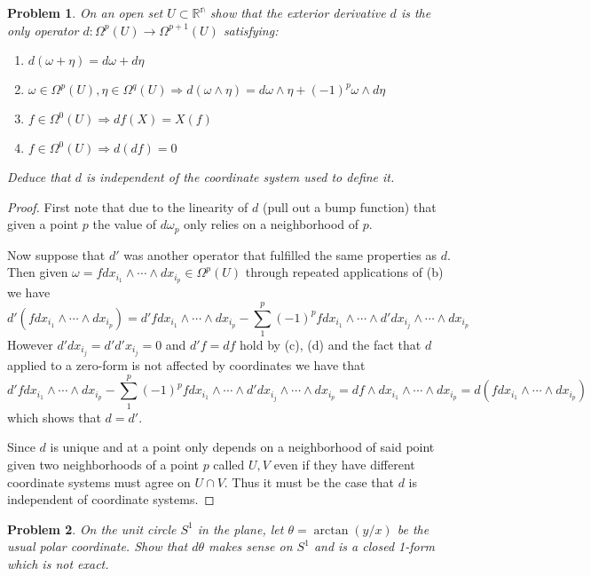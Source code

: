 \documentclass[10pt]{article}
\newcommand{\sk}{\vskip 10mm}
\newcommand{\bb}[1]{\mathbb{#1}}
\theoremstyle{plain}
\newtheorem{problem}{Problem}
\theoremstyle{remark}
\begin{document}
\begin{problem}
  On an open set $U\subset \bb{R^n}$ show that the exterior derivative $d$ is
  the only operator $d:\Omega^p(U)\rightarrow\Omega^{p+1}(U)$ satisfying:
  \begin{enumerate}
  \item[(a)] $d(\omega+\eta)=d\omega+d\eta$
  \item[(b)] $\omega\in\Omega^p(U),\eta\in\Omega^q(U)\Rightarrow
    d(\omega\wedge \eta)=d\omega\wedge\eta+(-1)^p\omega\wedge d\eta$
  \item[(c)] $f\in\Omega^0(U)\Rightarrow df(X)=X(f)$
  \item[(d)] $f\in\Omega^0(U)\Rightarrow d(df)=0$
  \end{enumerate}
  Deduce that $d$ is independent of the coordinate system used to define it.
\end{problem}

\begin{proof}
  First note that due to the linearity of $d$ (pull out a bump function)
  that given a point $p$ the value of $d\omega_p$ only relies on a
  neighborhood of $p$.

  Now suppose that $d'$ was another operator that fulfilled the same
  properties as $d$. Then given $\omega=fdx_{i_1}\wedge\cdots\wedge dx_{i_p}\in\Omega^p(U)$
  through repeated applications of (b) we have
  \[
    d'(fdx_{i_1}\wedge\cdots\wedge dx_{i_p})=d'fdx_{i_1}\wedge\cdots\wedge dx_{i_p} -\sum_1^p(-1)^pfdx_{i_1}\wedge\cdots\wedge d'dx_{i_j}\wedge\cdots\wedge dx_{i_p}
  \]
  However $d'dx_{i_j} = d'd'x_{i_j}= 0$ and $d'f=df$ hold by (c), (d) and the fact that
  $d$ applied to a zero-form is not affected by coordinates we have that
  \[
    d'fdx_{i_1}\wedge\cdots\wedge dx_{i_p} -\sum_1^p(-1)^pfdx_{i_1}\wedge\cdots\wedge d'dx_{i_j}\wedge\cdots\wedge dx_{i_p} = df\wedge dx_{i_1}\wedge\cdots\wedge dx_{i_p}=d(f dx_{i_1}\wedge\cdots\wedge dx_{i_p})
  \]
  which shows that $d = d'$.

  Since $d$ is unique and at a point only depends on a neighborhood of said point
  given two neighborhoods of a point $p$ called $U,V$ even if they have different
  coordinate systems must agree on $U\cap V$. Thus it must be the case that $d$ is
  independent of coordinate systems.
\end{proof}

\sk

\begin{problem}
  On the unit circle $S^1$ in the plane, let $\theta=\arctan(y/x)$ be the usual
  polar coordinate. Show that $d\theta$ makes sense on $S^1$ and is a closed
  1-form which is not exact.
\end{problem}
\end{document}
